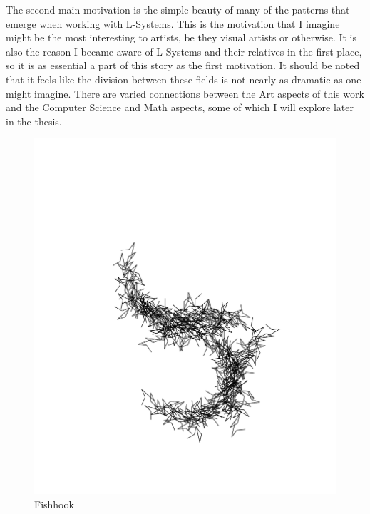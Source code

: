 \documentclass[12pt,twoside]{reedthesis}
\begin{document}
	\addtocounter{footnote}{-1}
	\addtocounter{footnote}{1}


	The second main motivation is the simple beauty of many of the patterns that emerge when working with L-Systems. This is the motivation that I imagine might be the most interesting to artists, be they visual artists or otherwise. It is also the reason I became aware of L-Systems and their relatives in the first place, so it is as essential a part of this story as the first motivation. It should be noted that it feels like the division between these fields is not nearly as dramatic as one might imagine. There are varied connections between the Art aspects of this work and the Computer Science and Math aspects, some of which I will explore later in the thesis. 
	
	\begin{figure}[h!]
	\centering
	\includegraphics[clip=true, viewport=1in 1.5in 9in 8.5in, scale=0.3]{Images/Motivations2}
	\caption[Fishhook]{Fishhook\footnotemark}
	\label {Motivations2}
	\end{figure}
	
\end{document}
